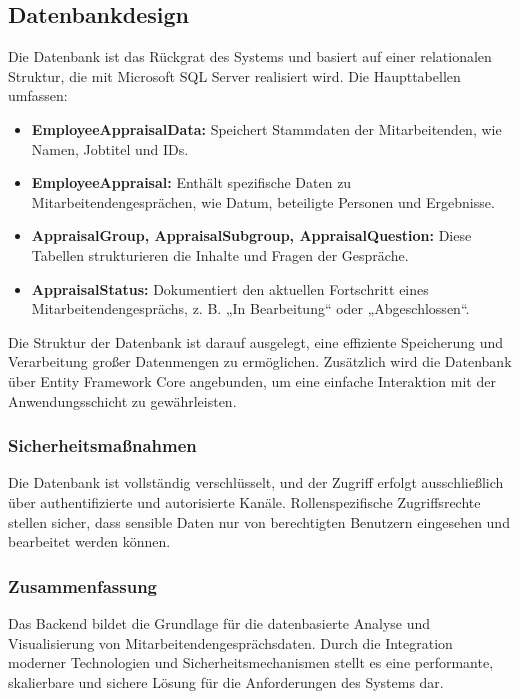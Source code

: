 \subsection{Datenbankdesign}

Die Datenbank ist das Rückgrat des Systems und basiert auf einer relationalen Struktur, die mit Microsoft SQL Server realisiert wird. Die Haupttabellen umfassen:
\begin{itemize}
    \item \textbf{EmployeeAppraisalData:} Speichert Stammdaten der Mitarbeitenden, wie Namen, Jobtitel und IDs.
    \item \textbf{EmployeeAppraisal:} Enthält spezifische Daten zu Mitarbeitendengesprächen, wie Datum, beteiligte Personen und Ergebnisse.
    \item \textbf{AppraisalGroup, AppraisalSubgroup, AppraisalQuestion:} Diese Tabellen strukturieren die Inhalte und Fragen der Gespräche.
    \item \textbf{AppraisalStatus:} Dokumentiert den aktuellen Fortschritt eines Mitarbeitendengesprächs, z. B. „In Bearbeitung“ oder „Abgeschlossen“.
\end{itemize}

Die Struktur der Datenbank ist darauf ausgelegt, eine effiziente Speicherung und Verarbeitung großer Datenmengen zu ermöglichen. Zusätzlich wird die Datenbank über Entity Framework Core angebunden, um eine einfache Interaktion mit der Anwendungsschicht zu gewährleisten.

\subsubsection*{Sicherheitsmaßnahmen}
Die Datenbank ist vollständig verschlüsselt, und der Zugriff erfolgt ausschließlich über authentifizierte und autorisierte Kanäle. Rollenspezifische Zugriffsrechte stellen sicher, dass sensible Daten nur von berechtigten Benutzern eingesehen und bearbeitet werden können.
\cite{liu2021security}
\subsubsection*{Zusammenfassung}
Das Backend bildet die Grundlage für die datenbasierte Analyse und Visualisierung von Mitarbeitendengesprächsdaten. Durch die Integration moderner Technologien und Sicherheitsmechanismen stellt es eine performante, skalierbare und sichere Lösung für die Anforderungen des Systems dar.\cite{microsoft2020azure}


